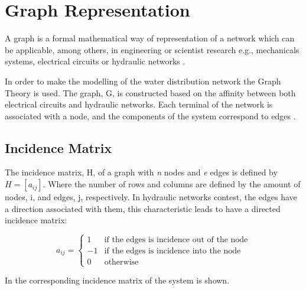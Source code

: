 \section{Graph Representation}  
\label{GraphTheory}
A graph is a formal mathematical way of representation of a network which can be applicable, among others, 
in engineering or scientist research e.g., mechanicals systems, electrical circuits or hydraulic networks \cite{graph_intro}. 

In order to make the modelling of the water distribution network the Graph Theory is used. The graph, G, is constructed 
based on the affinity between both electrical circuits and hydraulic networks. 
Each terminal of the network is associated with a node, and the components of the system correspond to edges \cite{GraphTheoryCarsten}. 
\subsection{Incidence Matrix} 

The incidence matrix, H, of a graph with \textit{n} nodes and \textit{e} edges is 
defined by $H = [a_{ij}]$. Where the number of rows and columns are defined by the amount of nodes, i, and edges, j, respectively.
In hydraulic networks contest, the edges have a direction associated with them, this characteristic leads to have a directed incidence matrix:

\begin{equation}
\label{DiGraph}
 a_{ij} =
		\left\{
		\begin{array}{ll}
		
		1 			&      \text{if the edges is incidence out of the node}	
\\
		-1                       &     \text{if the edges is incidence into the node}
\\

                0                       &      \text{otherwise}

		\end{array}
		\right.
\end{equation}	

In  the corresponding incidence matrix of the system is 
shown. %

